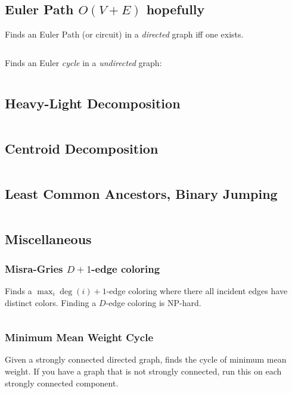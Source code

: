 \documentclass[9pt,a4paper,landscape,oneside]{amsart}
\newcommand{\mintedstyle}[2]{\inputminted{#1}{code/#2}}
\newcommand{\code}[1]{\mintedstyle{cpp}{#1}}
\begin{document}
\begin{multicols*}{3}
\code{graphs/mst_kruskal.cpp}

\subsection{Euler Path $O(V+E)$ hopefully}
Finds an Euler Path (or circuit) in a \emph{directed} graph iff one exists.
\code{graphs/euler_path.cpp}
Finds an Euler \emph{cycle} in a \emph{undirected} graph:
\code{graphs/euler_path_undirected.cpp}

\subsection{Heavy-Light Decomposition}
\code{graphs/hld.cpp}

\subsection{Centroid Decomposition}
\code{graphs/centroid_decomposition.cpp}

\subsection{Least Common Ancestors, Binary Jumping}
\code{graphs/lca.cpp}


\subsection{Miscellaneous}

\subsubsection{Misra-Gries $D+1$-edge coloring}
Finds a $\max_i \deg(i) + 1$-edge coloring where there all incident edges have distinct colors.
Finding a $D$-edge coloring is NP-hard.
\code{graphs/MisraGries.cpp}

\subsubsection{Minimum Mean Weight Cycle}
Given a strongly connected directed graph, finds the cycle of minimum
mean weight. If you have a graph that is not strongly connected, run
this on each strongly connected component.
\code{graphs/min_mean_cycle.cpp}


\end{multicols*}
\end{document}
